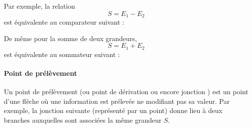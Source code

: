 Par exemple, la relation 
$$
S = E_1-E_2 
$$
est équivalente au comparateur suivant :
\begin{center}
\end{center}

De même pour la somme de deux grandeurs,
$$                                                                                                                            
S = E_1+E_2                                                                                                          
$$
est équivalente au sommateur suivant :
\begin{center}
\end{center}

\paragraph{Point de prélèvement}

Un point de prélèvement (ou point de dérivation ou encore jonction ) 
est un point d'une flèche où une information est prélevée ne modifiant pas sa valeur.
Par exemple, la jonction suivante (représenté par un point) donne lieu à deux branches auxquelles sont
associées la même grandeur $S$.

\begin{center}
\end{center}

